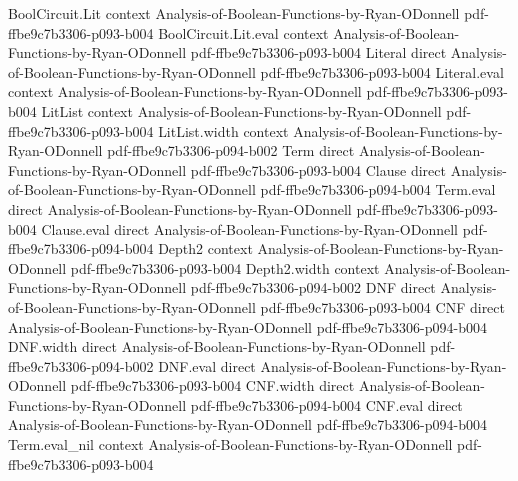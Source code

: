 \begin{lemma}
\label{BooleanAnalysis.chiS_singleton}
\leanok
{}
\proofstep
  {BoolCircuit.Lit}
  {context}
  {Analysis-of-Boolean-Functions-by-Ryan-ODonnell}
  {pdf-ffbe9c7b3306-p093-b004}
\proofstep
  {BoolCircuit.Lit.eval}
  {context}
  {Analysis-of-Boolean-Functions-by-Ryan-ODonnell}
  {pdf-ffbe9c7b3306-p093-b004}
\proofstep
  {Literal}
  {direct}
  {Analysis-of-Boolean-Functions-by-Ryan-ODonnell}
  {pdf-ffbe9c7b3306-p093-b004}
\proofstep
  {Literal.eval}
  {context}
  {Analysis-of-Boolean-Functions-by-Ryan-ODonnell}
  {pdf-ffbe9c7b3306-p093-b004}
\proofstep
  {LitList}
  {context}
  {Analysis-of-Boolean-Functions-by-Ryan-ODonnell}
  {pdf-ffbe9c7b3306-p093-b004}
\proofstep
  {LitList.width}
  {context}
  {Analysis-of-Boolean-Functions-by-Ryan-ODonnell}
  {pdf-ffbe9c7b3306-p094-b002}
\proofstep
  {Term}
  {direct}
  {Analysis-of-Boolean-Functions-by-Ryan-ODonnell}
  {pdf-ffbe9c7b3306-p093-b004}
\proofstep
  {Clause}
  {direct}
  {Analysis-of-Boolean-Functions-by-Ryan-ODonnell}
  {pdf-ffbe9c7b3306-p094-b004}
\proofstep
  {Term.eval}
  {direct}
  {Analysis-of-Boolean-Functions-by-Ryan-ODonnell}
  {pdf-ffbe9c7b3306-p093-b004}
\proofstep
  {Clause.eval}
  {direct}
  {Analysis-of-Boolean-Functions-by-Ryan-ODonnell}
  {pdf-ffbe9c7b3306-p094-b004}
\proofstep
  {Depth2}
  {context}
  {Analysis-of-Boolean-Functions-by-Ryan-ODonnell}
  {pdf-ffbe9c7b3306-p093-b004}
\proofstep
  {Depth2.width}
  {context}
  {Analysis-of-Boolean-Functions-by-Ryan-ODonnell}
  {pdf-ffbe9c7b3306-p094-b002}
\proofstep
  {DNF}
  {direct}
  {Analysis-of-Boolean-Functions-by-Ryan-ODonnell}
  {pdf-ffbe9c7b3306-p093-b004}
\proofstep
  {CNF}
  {direct}
  {Analysis-of-Boolean-Functions-by-Ryan-ODonnell}
  {pdf-ffbe9c7b3306-p094-b004}
\proofstep
  {DNF.width}
  {direct}
  {Analysis-of-Boolean-Functions-by-Ryan-ODonnell}
  {pdf-ffbe9c7b3306-p094-b002}
\proofstep
  {DNF.eval}
  {direct}
  {Analysis-of-Boolean-Functions-by-Ryan-ODonnell}
  {pdf-ffbe9c7b3306-p093-b004}
\proofstep
  {CNF.width}
  {direct}
  {Analysis-of-Boolean-Functions-by-Ryan-ODonnell}
  {pdf-ffbe9c7b3306-p094-b004}
\proofstep
  {CNF.eval}
  {direct}
  {Analysis-of-Boolean-Functions-by-Ryan-ODonnell}
  {pdf-ffbe9c7b3306-p094-b004}
\proofstep
  {Term.eval_nil}
  {context}
  {Analysis-of-Boolean-Functions-by-Ryan-ODonnell}
  {pdf-ffbe9c7b3306-p093-b004}

\end{lemma}
